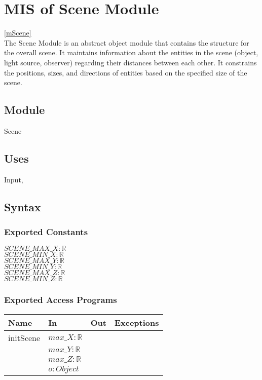 \documentclass[12pt, titlepage]{article}
\begin{document}
\newpage

\section{MIS of Scene Module} \ref{mScene} \\
The Scene Module is an abstract object module that contains the structure for 
the overall scene. It maintains information about the entities in the scene 
(object, light source, observer) regarding their distances between each other. 
It constrains the positions, sizes, and directions of entities based on the 
specified size of the scene.
%
%

\subsection{Module}
Scene

\subsection{Uses}
Input,  

\subsection{Syntax}
\subsubsection{Exported Constants}
$SCENE\_MAX\_X : \mathbb{R}$\\
$SCENE\_MIN\_X : \mathbb{R}$\\
$SCENE\_MAX\_Y : \mathbb{R}$\\
$SCENE\_MIN\_Y : \mathbb{R}$\\
$SCENE\_MAX\_Z : \mathbb{R}$\\
$SCENE\_MIN\_Z : \mathbb{R}$\\
\subsubsection{Exported Access Programs}
\begin{center}
	\begin{tabular}{p{4cm} p{2cm} p{2cm} p{4cm}}
		\hline
		\textbf{Name} & \textbf{In} & \textbf{Out} & \textbf{Exceptions} \\
		\hline
		initScene & $max\_X : \mathbb{R}$ & & \\
		 & $max\_Y : \mathbb{R}$ & & \\		
		 & $max\_Z : \mathbb{R}$ & & \\				 
		 & $o : Object$ & & \\				 
		\hline
	\end{tabular}
\end{center}
\end{document}
